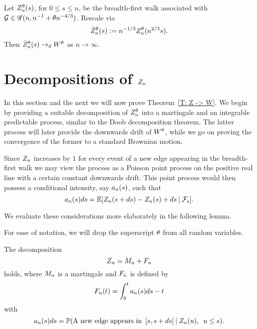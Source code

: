 \begin{theorem} \label{T: Z -> W}
	Let $Z_n^{\theta}(s)$, for $0 \leq s \leq n$, 
	be the breadth-first walk associated with $\mathcal{G} \in \mathscr{G}(n, n^{-1} + \theta n^{-4/3})$.
	Rescale via
	\begin{equation*}
	\bar{Z}_n^\theta(s) := n^{-1 / 3} Z_n^{\theta}(n^{2 / 3}s).
	\end{equation*}
	Then $\bar{Z}_n^\theta(s) \rightarrow_d W^{\theta}$ as $n \rightarrow \infty$.
\end{theorem}



\section{Decompositions of $Z_n$}

In this section and the next we will now prove Theorem~\ref{T: Z -> W}.
We begin by providing a suitable decomposition of $Z_n^{\theta}$ into a martingale and
an integrable predictable process, similar to the Doob decomposition theorem.
The latter process will later provide the downwards drift of $W^{\theta}$,
while we go on proving the convergence of the former to a standard Brownian motion.

Since $Z_n$ increases by $1$ for every event of a new edge appearing in the breadth-first walk
we may view the process as a Poisson point process on the positive real line with a certain constant downwards drift.
This point process would then possess a conditional intensity, say $a_n(s)$, such that
\begin{equation}
	a_n(s)ds = \mathbb{E}[ Z_n(s + ds) - Z_n(s) + ds \: | \: \mathcal{F}_{s} ].
\end{equation}
 
We evaluate these considerations more elaborately in the following lemma.

For ease of notation, we will drop the superscript $\theta$ from all random variables.

\begin{lemma} \label{L: decomp Zn}
	The decomposition 
	\begin{equation} \label{E: decomp Zn}
	Z_n = M_n + F_n
	\end{equation}
	holds, where $M_n$ is a martingale and $F_n$ is defined by
	\begin{equation} \label{D: An}
	F_n(t) = \int_{0}^{t} a_n(s)ds - t
	\end{equation}
	with
	\begin{equation} \label{D: an}
	a_n(s)ds = \mathbb{P}(\text{A new edge appears in} \enspace [s, s+ds] \: | \: Z_n(u), \enspace u \leq s).
	\end{equation}
\end{lemma}

